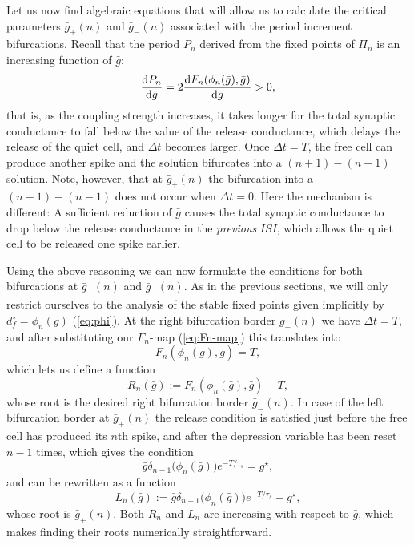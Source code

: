 \documentclass[utf8]{frontiersFPHY} %
\newcommand{\dstar}{d^\star}
\newcommand{\gstar}{g^\star}
\newcommand{\gbar}{\bar g}
\newcommand{\delt}{\Delta t}
\newcommand{\taus}{\tau_s}
\begin{document}
Let us now find algebraic equations that will allow us to calculate the critical parameters $\gbar_+(n)$ and $\gbar_-(n)$ associated with the period increment bifurcations.
Recall that the period $P_n$ derived from the fixed points of $\Pi_n$ is an increasing function of $\gbar$:
\begin{equation}
  \dv{P_{n}}{\gbar}=2\dv{F_n(\phi_n(\gbar), \gbar)}{\gbar}>0,
\end{equation}
that is, as the coupling strength increases, it takes longer for the total synaptic conductance to fall below the value of the release conductance, which delays the release of the quiet cell, and $\delt$ becomes larger.
Once $\delt=T$, the free cell can produce another spike and the solution bifurcates into a $(n+1)-(n+1)$ solution.
Note, however, that at $\gbar_+(n)$ the bifurcation into a $(n-1)-(n-1)$ does not occur when $\delt=0$.
Here the mechanism is different: A sufficient reduction of $\gbar$ causes the total synaptic conductance to drop below the release conductance in the \emph{previous} $ISI$, which allows the quiet cell to be released one spike earlier.

Using the above reasoning we can now formulate the conditions for both bifurcations at $\gbar_+(n)$ and $\gbar_-(n)$.
As in the previous sections, we will only restrict ourselves to the analysis of the stable fixed points given implicitly by $\dstar_f=\phi_n(\gbar)$ (\cref{eq:phi}).
At the right bifurcation border $\gbar_-(n)$ we have $\delt=T$, and after substituting our $F_{n}$-map (\cref{eq:Fn-map}) this translates into
\begin{equation}
  F_n(\phi_n(\gbar), \gbar) = T,
\end{equation}
which lets us define a function
\begin{equation}
  \label{eq:R}
  R_{n}(\gbar):=F_n(\phi_n(\gbar), \gbar)-T,
\end{equation}
whose root is the desired right bifurcation border $\gbar_-(n)$.
In case of the left bifurcation border at $\gbar_+(n)$ the release condition is satisfied just before the free cell has produced its $n$th spike, and after the depression variable has been reset $n-1$ times, which gives the condition
\begin{equation}
  \gbar \delta_{n-1}\big(\phi_{n}(\gbar)\big)e^{-T/\taus} = \gstar,
\end{equation}
and can be rewritten as a function
\begin{equation}
  \label{eq:L}
  L_{n}(\gbar):=\gbar \delta_{n-1}\big(\phi_{n}(\gbar)\big)e^{-T/\taus} -\gstar,
\end{equation}
whose root is $\gbar_+(n)$.
Both $R_{n}$ and $L_{n}$ are increasing with respect to $\gbar$, which makes finding their roots numerically straightforward.
\end{document}
